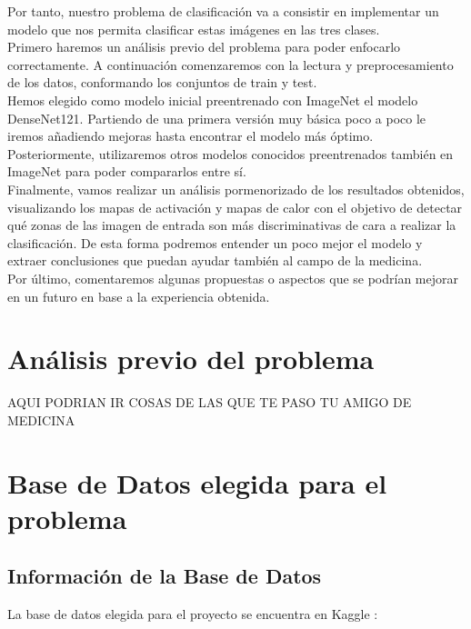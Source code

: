 \documentclass[11pt,a4paper]{article}
\theoremstyle{definition}
\begin{document}
Por tanto, nuestro problema de clasificación va a consistir en implementar un modelo que nos permita clasificar estas imágenes en las tres clases.\\

Primero haremos un análisis previo del problema para poder enfocarlo correctamente. A continuación comenzaremos con la lectura y preprocesamiento de los datos, conformando los conjuntos de train y test.\\

Hemos elegido como modelo inicial preentrenado con ImageNet el modelo DenseNet121. Partiendo de una primera versión muy básica poco a poco le iremos añadiendo mejoras hasta encontrar el modelo más óptimo.\\

Posteriormente, utilizaremos otros modelos conocidos preentrenados también en ImageNet para poder compararlos entre sí.\\

Finalmente, vamos realizar un análisis pormenorizado de los resultados obtenidos, visualizando los mapas de activación y mapas de calor con el objetivo de detectar qué zonas de las imagen de entrada son más discriminativas de cara a realizar la clasificación. De esta forma podremos entender un poco mejor el modelo y extraer conclusiones que puedan ayudar también al campo de la medicina.\\

Por último, comentaremos algunas propuestas o aspectos que se podrían mejorar en un futuro en base a la experiencia obtenida.\\


\newpage

\section{Análisis previo del problema}

AQUI PODRIAN IR COSAS DE LAS QUE TE PASO TU AMIGO DE MEDICINA

\section{Base de Datos elegida para el problema}
\subsection{Información de la Base de Datos}
La base de datos elegida para el proyecto se encuentra en Kaggle :
\end{document}
